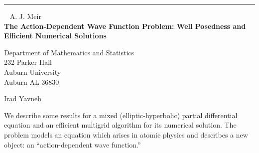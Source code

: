 \documentclass{report}
\begin{document}
\begin{center}

\rule{6in}{1pt} \
{\large
A. J. Meir
\\ {\bf
The Action-Dependent Wave Function Problem: Well Posedness and
Efficient Numerical Solutions
}}

Department of Mathematics and Statistics \\
232 Parker Hall \\
Auburn University \\
Auburn AL 36830

Irad Yavneh
\end{center}

 
We describe some results for a mixed (elliptic-hyperbolic) partial
differential equation and an efficient multigrid algorithm for its
numerical solution. The problem models an equation which arises in
atomic physics and describes a new object: an ``action-dependent wave
function.''

  
\end{document}
